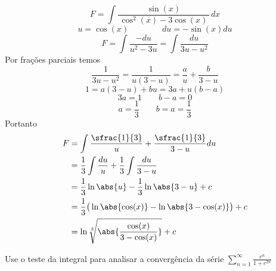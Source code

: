 \documentclass[a4paper,12pt,fleqn]{article}
\begin{document}
\begin{answer}
  \[
    F = \int \frac{\sin(x)}{\,\cos^2(x)- 3\cos(x)\,}\, dx
  \]
  \[
    u = \cos(x)
    \qquad\qquad
    du = -\sin(x)du
  \]
  \[
    F
    = \int \frac{-du}{u^2-3u}
    = \int \frac{du}{3u - u^2}
  \]
  Por frações parciais temos
  \[
    \frac{1}{3u-u^2}
    = \frac{1}{u(3-u)}
    = \frac{a}{u} + \frac{b}{3-u}
  \]
  \[
    1 = a(3-u) + bu = 3a + u(b-a)
  \]
  \[
    3a = 1 \qquad b-a = 0
  \]
  \[
    a = \frac{1}{3} \qquad b = a = \frac{1}{3}
  \]
  Portanto
  \begin{align*}
    F
    & = \int \frac{\sfrac{1}{3}}{u} + \frac{\sfrac{1}{3}}{3-u} du \\
    & = \frac{1}{3}\int \frac{du}{u} + \frac{1}{3}\int \frac{du}{3-u} \\
    & = \frac{1}{3}\ln\abs{u} - \frac{1}{3}\ln\abs{3-u} + c \\
    & = \frac{1}{3}\big(\ln\abs{\cos(x)} - \ln\abs{3-\cos(x)}\big) + c \\
    & = \ln\sqrt[3]{\abs{\frac{\cos(x)}{3-\cos(x)}}} + c
  \end{align*}

\end{answer}

Use o teste da integral para analisar a convergência da série
\(
  \sum_{n=1}^\infty \frac{e^n}{1+e^{2n}}
\)
\end{document}
